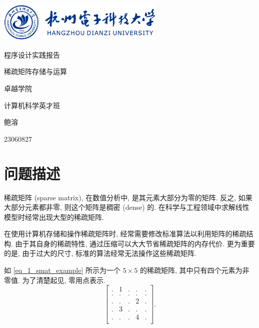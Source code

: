 \documentclass[a4paper]{article}
\begin{document}
\begin{titlepage}


\parbox[c]{8cm}{
    \includegraphics[width=8cm]{hdu.png}
}

\setlength{\parindent}{0pt}
\centering
\vfill
{ \heiti \textcolor{xblue}{程序设计实践报告}\par}
\vspace{10pt}
{ \heiti 稀疏矩阵存储与运算\par}
\vfill
{\large \heiti 卓越学院\par
计算机科学英才班\par
鲍溶\par
23060827\par
}
\vfill
\restoregeometry

\end{titlepage}

\renewcommand\contentsname{\textcolor{xblue}{目录}}
    \tableofcontents
\clearpage
\setcounter{page}{1}

\section{问题描述}

稀疏矩阵 (sparse matrix), 在数值分析中, 是其元素大部分为零的矩阵. 反之, 如果大部分元素都非零, 则这个矩阵是稠密 (dense) 的. 在科学与工程领域中求解线性模型时经常出现大型的稀疏矩阵.

在使用计算机存储和操作稀疏矩阵时, 经常需要修改标准算法以利用矩阵的稀疏结构. 由于其自身的稀疏特性, 通过压缩可以大大节省稀疏矩阵的内存代价. 更为重要的是, 由于过大的尺寸, 标准的算法经常无法操作这些稀疏矩阵.

如 \ref{eq_1_smat_example} 所示为一个 $5 \times 5$ 的稀疏矩阵, 其中只有四个元素为非零值. 为了清楚起见, 零用点表示.
\begin{equation}
    \begin{bmatrix}
        . & 1 & . & . & . \\
        . & . & . & . & . \\
        . & . & . & 2 & . \\
        . & 3 & . & . & . \\
        . & . & . & 4 & . \\
    \end{bmatrix}.
    \label{eq_1_smat_example}
\end{equation}
\end{document}
